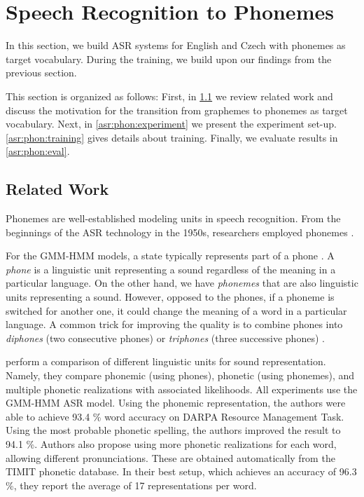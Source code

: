 \pagebreak


\section{Speech Recognition to Phonemes}
\label{asr:transfer_phonemes}
In this section, we build ASR systems for English and Czech with phonemes as target vocabulary. During the training, we build upon our findings from the previous section.

This section is organized as follows: First, in \cref{asr:phon:related} we review related work and discuss the motivation for the transition from graphemes to phonemes as target vocabulary. Next, in \cref{asr:phon:experiment} we present the experiment set-up. \cref{asr:phon:training} gives details about training. Finally, we evaluate results in \cref{asr:phon:eval}.

\subsection{Related Work}
\label{asr:phon:related}

Phonemes are well-established modeling units in speech recognition. From the beginnings of the ASR technology in the 1950s, researchers employed phonemes . 

For the GMM-HMM models, a state typically represents part of a phone . A \emph{phone} is a linguistic unit representing a sound regardless of the meaning in a particular language. On the other hand, we have \emph{phonemes} that are also linguistic units representing a sound. However, opposed to the phones, if a phoneme is switched for another one, it could change the meaning of a word in a particular language. A common trick for improving the quality is to combine phones into \emph{diphones} (two consecutive phones) or \emph{triphones} (three successive phones) .  

 perform a comparison of different linguistic units for sound representation. Namely, they compare phonemic (using phones), phonetic (using phonemes), and multiple phonetic realizations with associated likelihoods. All experiments use the GMM-HMM ASR model. Using the phonemic representation, the authors were able to achieve 93.4 \% word accuracy on DARPA Resource Management Task. Using the most probable phonetic spelling, the authors improved the result to 94.1 \%. Authors also propose using more phonetic realizations for each word, allowing different pronunciations. These are obtained automatically from the TIMIT phonetic database. In their best setup, which achieves an accuracy of 96.3 \%, they report the average of 17 representations per word.

